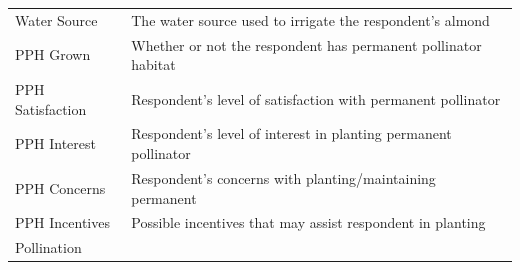\documentclass[12pt,]{article}
\begin{document}
\begin{longtable}[]{@{}ll@{}}
\begin{minipage}[t]{0.38\columnwidth}\raggedright\strut
Water Source\strut
\end{minipage} & \begin{minipage}[t]{0.18\columnwidth}\raggedright\strut
The water source used to irrigate the respondent's almond\strut
\end{minipage}\tabularnewline
\begin{minipage}[t]{0.38\columnwidth}\raggedright\strut
PPH Grown\strut
\end{minipage} & \begin{minipage}[t]{0.18\columnwidth}\raggedright\strut
Whether or not the respondent has permanent pollinator habitat\strut
\end{minipage}\tabularnewline
\begin{minipage}[t]{0.38\columnwidth}\raggedright\strut
PPH Satisfaction\strut
\end{minipage} & \begin{minipage}[t]{0.18\columnwidth}\raggedright\strut
Respondent's level of satisfaction with permanent pollinator\strut
\end{minipage}\tabularnewline
\begin{minipage}[t]{0.38\columnwidth}\raggedright\strut
PPH Interest\strut
\end{minipage} & \begin{minipage}[t]{0.18\columnwidth}\raggedright\strut
Respondent's level of interest in planting permanent pollinator\strut
\end{minipage}\tabularnewline
\begin{minipage}[t]{0.38\columnwidth}\raggedright\strut
PPH Concerns\strut
\end{minipage} & \begin{minipage}[t]{0.18\columnwidth}\raggedright\strut
Respondent's concerns with planting/maintaining permanent\strut
\end{minipage}\tabularnewline
\begin{minipage}[t]{0.38\columnwidth}\raggedright\strut
PPH Incentives\strut
\end{minipage} & \begin{minipage}[t]{0.18\columnwidth}\raggedright\strut
Possible incentives that may assist respondent in planting\strut
\end{minipage}\tabularnewline
\begin{minipage}[t]{0.38\columnwidth}\raggedright\strut
Pollination\strut
\end{minipage} & \begin{minipage}[t]{0.18\columnwidth}\raggedright\strut

\end{minipage}
\end{longtable}
\end{document}
